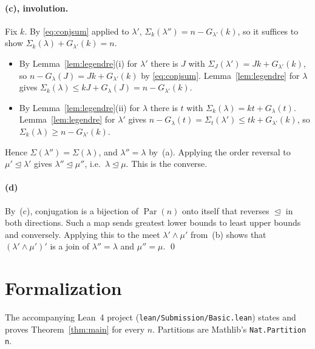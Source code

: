 \documentclass[11pt]{article}
\theoremstyle{plain}
\theoremstyle{definition}
\theoremstyle{remark}
\newcommand{\Par}{\operatorname{Par}}
\newcommand{\dom}{\trianglelefteq}
\begin{document}
\paragraph{(c), involution.} Fix $k$. By \eqref{eq:conjsum} applied to
$\lambda'$, $\Sigma_k(\lambda'')=n-G_{\lambda'}(k)$, so it suffices to show
$\Sigma_k(\lambda)+G_{\lambda'}(k)=n$.
\begin{itemize}
  \item By Lemma~\ref{lem:legendre}(i) for $\lambda'$ there is $J$ with
    $\Sigma_J(\lambda')=Jk+G_{\lambda'}(k)$, so
    $n-G_\lambda(J)=Jk+G_{\lambda'}(k)$ by \eqref{eq:conjsum}.
    Lemma~\ref{lem:legendre} for $\lambda$ gives
    $\Sigma_k(\lambda)\le kJ+G_\lambda(J)=n-G_{\lambda'}(k)$.
  \item By Lemma~\ref{lem:legendre}(ii) for $\lambda$ there is $t$ with
    $\Sigma_k(\lambda)=kt+G_\lambda(t)$. Lemma~\ref{lem:legendre} for $\lambda'$
    gives $n-G_\lambda(t)=\Sigma_t(\lambda')\le tk+G_{\lambda'}(k)$, so
    $\Sigma_k(\lambda)\ge n-G_{\lambda'}(k)$.
\end{itemize}
Hence $\Sigma(\lambda'')=\Sigma(\lambda)$, and $\lambda''=\lambda$ by~(a).
Applying the order reversal to $\mu'\dom\lambda'$ gives
$\lambda''\dom\mu''$, i.e.\ $\lambda\dom\mu$. This is the converse.

\paragraph{(d)} By~(c), conjugation is a bijection of $\Par(n)$ onto itself
that reverses $\dom$ in both directions. Such a map sends greatest lower
bounds to least upper bounds and conversely. Applying this to the meet
$\lambda'\wedge\mu'$ from~(b) shows that $(\lambda'\wedge\mu')'$ is a join of
$\lambda''=\lambda$ and $\mu''=\mu$. \qed

\section{Formalization}

The accompanying Lean~4 project (\texttt{lean/Submission/Basic.lean}) states
and proves Theorem~\ref{thm:main} for every $n$. Partitions are Mathlib's
\texttt{Nat.Partition n}.
\end{document}
